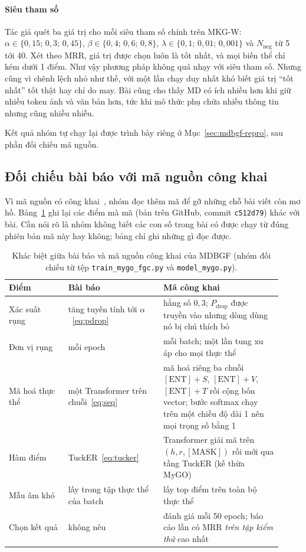 \documentclass[conference,a4paper]{IEEEtran}
\begin{document}
\paragraph{Siêu tham số} Tác giả quét ba giá trị cho mỗi siêu tham số chính trên MKG-W: $\alpha \in \{0{,}15;\,0{,}3;\,0{,}45\}$, $\beta \in \{0{,}4;\,0{,}6;\,0{,}8\}$, $\lambda \in \{0{,}1;\,0{,}01;\,0{,}001\}$ và $N_{\mathrm{neg}}$ từ 5 tới 40. Xét theo MRR, giá trị được chọn luôn là tốt nhất, và mọi biến thể chỉ kém dưới 1 điểm. Như vậy phương pháp không quá nhạy với siêu tham số. Nhưng cũng vì chênh lệch nhỏ như thế, với một lần chạy duy nhất khó biết giá trị ``tốt nhất'' tốt thật hay chỉ do may. Bài cũng cho thấy MD có ích nhiều hơn khi giữ nhiều token ảnh và văn bản hơn, tức khi mô thức phụ chứa nhiều thông tin nhưng cũng nhiều nhiễu.

Kết quả nhóm tự chạy lại được trình bày riêng ở Mục~\ref{sec:mdbgf-repro}, sau phần đối chiếu mã nguồn.

\subsection{Đối chiếu bài báo với mã nguồn công khai}
\label{sec:mdbgf-code}

Vì mã nguồn có công khai~\cite{mdbgf}, nhóm đọc thêm mã để gỡ những chỗ bài viết còn mơ hồ. Bảng~\ref{tab:mdbgf-code} ghi lại các điểm mà mã (bản trên GitHub, commit \texttt{c512d79}) khác với bài. Cần nói rõ là nhóm không biết các con số trong bài có được chạy từ đúng phiên bản mã này hay không; bảng chỉ ghi những gì đọc được.

\begin{table}[t]
\centering
\caption{Khác biệt giữa bài báo và mã nguồn công khai của MDBGF (nhóm đối chiếu từ tệp \texttt{train\_mygo\_fgc.py} và \texttt{model\_mygo.py}).}
\label{tab:mdbgf-code}
\footnotesize
\setlength{\tabcolsep}{3pt}
\begin{tabular}{>{\raggedright\arraybackslash}p{0.2\linewidth} >{\raggedright\arraybackslash}p{0.32\linewidth} >{\raggedright\arraybackslash}p{0.4\linewidth}}
\toprule
Điểm & Bài báo & Mã công khai\\
\midrule
Xác suất rụng & tăng tuyến tính tới $\alpha$~\eqref{eq:pdrop} & hằng số $0{,}3$; $P_{\mathrm{drop}}$ được truyền vào nhưng dòng dùng nó bị chú thích bỏ\\
Đơn vị rụng & mỗi epoch & mỗi batch; một lần tung xu áp cho mọi thực thể\\
Mã hoá thực thể & một Transformer trên chuỗi~\eqref{eq:seq} & mã hoá riêng ba chuỗi $[\mathrm{ENT}]{+}S$, $[\mathrm{ENT}]{+}V$, $[\mathrm{ENT}]{+}T$ rồi cộng bốn vector; bước softmax chạy trên một chiều độ dài 1 nên mọi trọng số bằng 1\\
Hàm điểm & TuckER~\eqref{eq:tucker} & Transformer giải mã trên $(h, r, [\mathrm{MASK}])$ rồi mới qua tầng TuckER (kế thừa MyGO)\\
Mẫu âm khó & lấy trong tập thực thể của batch & lấy top điểm trên toàn bộ thực thể\\
Chọn kết quả & không nêu & đánh giá mỗi 50 epoch; báo cáo lần có MRR \emph{trên tập kiểm thử} cao nhất\\
\bottomrule
\end{tabular}
\end{table}
\end{document}
